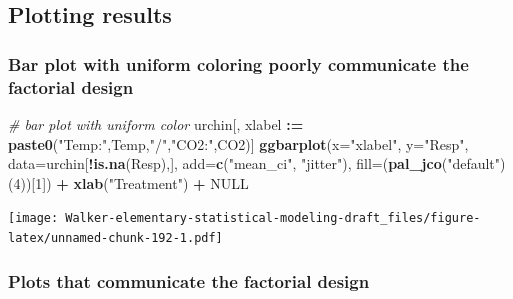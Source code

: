\documentclass[]{book}
\newenvironment{Shaded}{\begin{snugshade}}{\end{snugshade}}
\newcommand{\CommentTok}[1]{\textcolor[rgb]{0.56,0.35,0.01}{\textit{#1}}}
\newcommand{\DataTypeTok}[1]{\textcolor[rgb]{0.13,0.29,0.53}{#1}}
\newcommand{\DecValTok}[1]{\textcolor[rgb]{0.00,0.00,0.81}{#1}}
\newcommand{\ErrorTok}[1]{\textcolor[rgb]{0.64,0.00,0.00}{\textbf{#1}}}
\newcommand{\KeywordTok}[1]{\textcolor[rgb]{0.13,0.29,0.53}{\textbf{#1}}}
\newcommand{\NormalTok}[1]{#1}
\newcommand{\OperatorTok}[1]{\textcolor[rgb]{0.81,0.36,0.00}{\textbf{#1}}}
\newcommand{\OtherTok}[1]{\textcolor[rgb]{0.56,0.35,0.01}{#1}}
\newcommand{\StringTok}[1]{\textcolor[rgb]{0.31,0.60,0.02}{#1}}
\begin{document}
\hypertarget{plotting-results}{%
\subsection{Plotting results}\label{plotting-results}}

\hypertarget{bar-plot-with-uniform-coloring-poorly-communicate-the-factorial-design}{%
\subsubsection{Bar plot with uniform coloring poorly communicate the factorial design}\label{bar-plot-with-uniform-coloring-poorly-communicate-the-factorial-design}}

\begin{Shaded}
\begin{Highlighting}[]
\CommentTok{# bar plot with uniform color}
\NormalTok{urchin[, xlabel }\OperatorTok{:}\ErrorTok{=}\StringTok{ }\KeywordTok{paste0}\NormalTok{(}\StringTok{"Temp:"}\NormalTok{,Temp,}\StringTok{"/"}\NormalTok{,}\StringTok{"CO2:"}\NormalTok{,CO2)]}
\KeywordTok{ggbarplot}\NormalTok{(}\DataTypeTok{x=}\StringTok{"xlabel"}\NormalTok{,}
          \DataTypeTok{y=}\StringTok{"Resp"}\NormalTok{,}
          \DataTypeTok{data=}\NormalTok{urchin[}\OperatorTok{!}\KeywordTok{is.na}\NormalTok{(Resp),],}
          \DataTypeTok{add=}\KeywordTok{c}\NormalTok{(}\StringTok{"mean_ci"}\NormalTok{, }\StringTok{"jitter"}\NormalTok{),}
          \DataTypeTok{fill=}\NormalTok{(}\KeywordTok{pal_jco}\NormalTok{(}\StringTok{"default"}\NormalTok{)(}\DecValTok{4}\NormalTok{))[}\DecValTok{1}\NormalTok{]) }\OperatorTok{+}
\StringTok{  }\KeywordTok{xlab}\NormalTok{(}\StringTok{"Treatment"}\NormalTok{) }\OperatorTok{+}
\StringTok{  }\OtherTok{NULL}
\end{Highlighting}
\end{Shaded}

\texttt{[image: Walker-elementary-statistical-modeling-draft\_files/figure-latex/unnamed-chunk-192-1.pdf]}

\hypertarget{plots-that-communicate-the-factorial-design}{%
\subsubsection{Plots that communicate the factorial design}\label{plots-that-communicate-the-factorial-design}}
\end{document}
